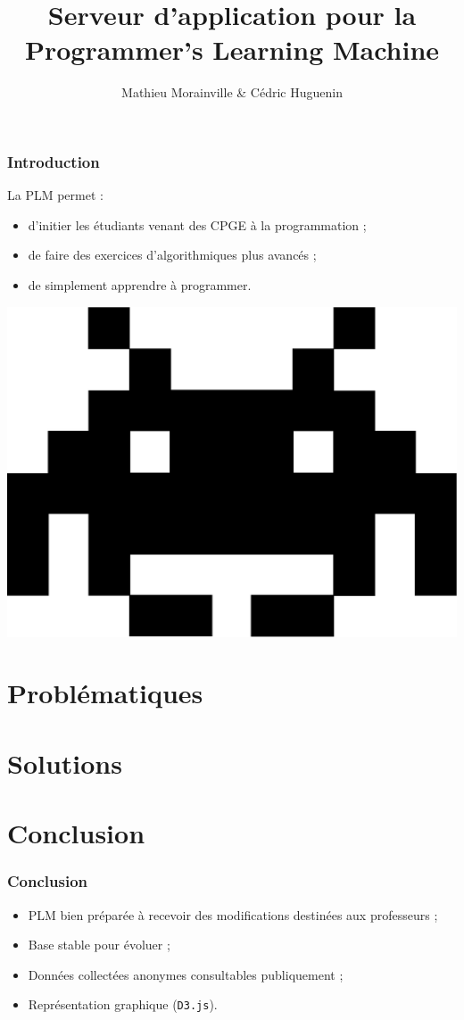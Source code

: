 \documentclass{beamer}
\title[Serveur d’application pour la PLM]{Serveur d’application pour la Programmer’s Learning Machine}
\subtitle{Mathieu Morainville \& Cédric Huguenin}
\institute{Encadrants : Martin Quinson \& Gérald Oster \\ TELECOM Nancy}
\begin{document}
 \begin{frame}
  \titlepage
 \end{frame}
 \begin{frame}
 	\frametitle{Introduction} %
 	La PLM permet :
 	\begin{itemize}
 	\item d'initier les étudiants venant des CPGE à la programmation ;
 	\item de faire des exercices d'algorithmiques plus avancés ;
 	\item de simplement apprendre à programmer.
 	\end{itemize}
 	\begin{center}
 	\onslide \includegraphics[scale=0.1]{images/buggle.eps}
 	\end{center}
 \end{frame}
  \begin{frame}
  \tableofcontents
 \end{frame}
\section{Problématiques}
	

\section{Solutions}
	
\section{Conclusion}
	\begin{frame}
	\frametitle{Conclusion}
		\begin{itemize}
			\item PLM bien préparée à recevoir des modifications destinées aux professeurs ;
			\item Base stable pour évoluer ;
			\item Données collectées anonymes consultables publiquement ;
			\item Représentation graphique (\texttt{D3.js}).
		\end{itemize}
	\end{frame}	
\end{document}
